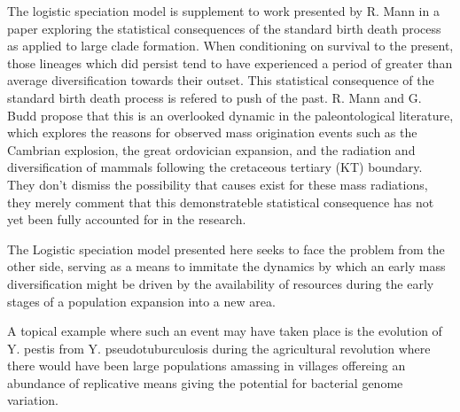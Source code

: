 \documentclass[twoside,12pt]{Classes/myThesis}
\theoremstyle{plain} %
\begin{document}
The logistic speciation model is supplement to work presented by R. Mann in a paper exploring the statistical consequences of the standard birth death process as applied to large clade formation.  When conditioning on survival to the present, those lineages which did persist tend to have experienced a  period of greater than average diversification towards their outset.   This statistical consequence of the standard birth death process is refered to push of the past.  R. Mann and G. Budd propose that this is an overlooked dynamic in the paleontological literature,  which explores the reasons for observed mass origination events such as the Cambrian explosion, the great ordovician expansion, and the radiation and diversification of mammals following the cretaceous tertiary (KT) boundary. 
They don't dismiss the possibility that causes exist for these mass radiations, they merely comment that this demonstrateble statistical consequence has not yet been fully accounted for in the research.\par
The Logistic speciation model presented here seeks to face the problem from the other side,  serving as a means to immitate the dynamics by which an early mass diversification might be driven by the availability of resources during the early stages of a population expansion into a new area.\par
A topical example where such an event may have taken place is the evolution of Y. pestis from Y. pseudotuburculosis during the agricultural revolution \cite{king2009evolution} \cite{mira2006neolithic} where there would have been large populations amassing in villages offereing an abundance of replicative means giving the potential for bacterial genome variation. 




%
%


\ifpdf
\fi
\tableofcontents


\mainmatter
















\appendix











%
%


\end{document}
